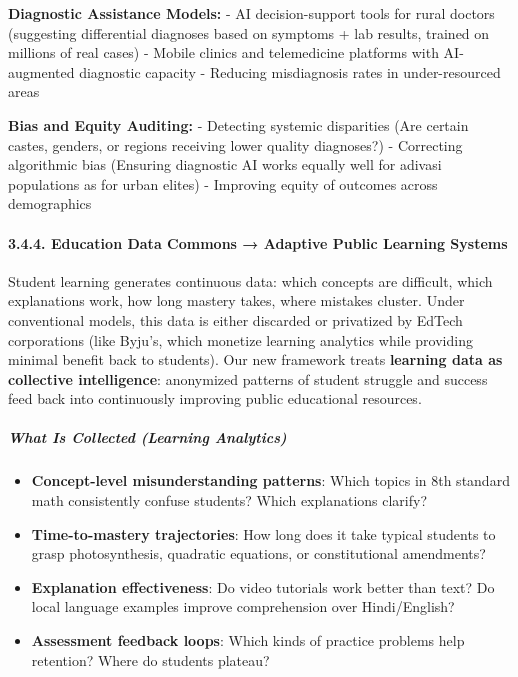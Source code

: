 \textbf{Diagnostic Assistance Models:} - AI decision-support tools for
rural doctors (suggesting differential diagnoses based on symptoms + lab
results, trained on millions of real cases) - Mobile clinics and
telemedicine platforms with AI-augmented diagnostic capacity - Reducing
misdiagnosis rates in under-resourced areas

\textbf{Bias and Equity Auditing:} - Detecting systemic disparities (Are
certain castes, genders, or regions receiving lower quality diagnoses?)
- Correcting algorithmic bias (Ensuring diagnostic AI works equally well
for adivasi populations as for urban elites) - Improving equity of
outcomes across demographics

\paragraph{3.4.4. Education Data Commons → Adaptive Public Learning
Systems}\label{education-data-commons-adaptive-public-learning-systems}

Student learning generates continuous data: which concepts are
difficult, which explanations work, how long mastery takes, where
mistakes cluster. Under conventional models, this data is either
discarded or privatized by EdTech corporations (like Byju's, which
monetize learning analytics while providing minimal benefit back to
students). Our new framework treats \textbf{learning data as collective
intelligence}: anonymized patterns of student struggle and success feed
back into continuously improving public educational resources.

\subparagraph{What Is Collected (Learning
Analytics)}\label{what-is-collected-learning-analytics}

\begin{itemize}
\tightlist
\item
  \textbf{Concept-level misunderstanding patterns}: Which topics in 8th
  standard math consistently confuse students? Which explanations
  clarify?
\item
  \textbf{Time-to-mastery trajectories}: How long does it take typical
  students to grasp photosynthesis, quadratic equations, or
  constitutional amendments?
\item
  \textbf{Explanation effectiveness}: Do video tutorials work better
  than text? Do local language examples improve comprehension over
  Hindi/English?
\item
  \textbf{Assessment feedback loops}: Which kinds of practice problems
  help retention? Where do students plateau?
\end{itemize}

